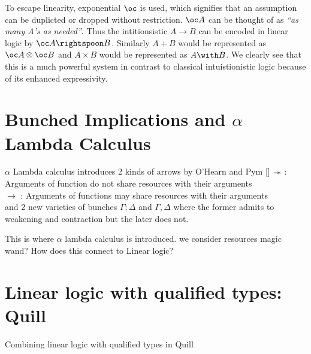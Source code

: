 To escape linearity, exponential $\oc$ is used, which signifies that an assumption can
be duplicted or dropped without restriction. $\oc A$ can be thought of as {\em``as many A's as needed''}.
Thus the intitionsistic $A \rightarrow B$ can be encoded in linear logic by $\oc A \rightspoon B$.
Similarly $A \plus B$ would be represented as $\oc A \otimes \oc B$ and $A \times B$ would be represented as $A \with B$. We clearly see that
this is a much powerful system in contrast to classical intuistionistic logic because of its enhanced expressivity.

\section{Bunched Implications and $\alpha$ Lambda Calculus}

$\alpha$ Lambda calculus introduces 2 kinds of arrows by O'Hearn and Pym [\cite{ohearn_logic_1999}]
$\mathrel{-\mkern-6mu*}$     : Arguments of function do not share resources with their arguments\\
$\rightarrow$ : Arguments of functions may share resources with their arguments\\
and 2 new varieties of bunches $\Gamma; \Delta$ and $\Gamma, \Delta$ where
the former admits to weakening and contraction but the later does not.

This is where $\alpha$ lambda calculus is introduced. we consider resources
magic wand? How does this connect to Linear logic?

\section{Linear logic with qualified types: Quill}
Combining linear logic with qualified types in Quill \cite{morris_best_2016}

